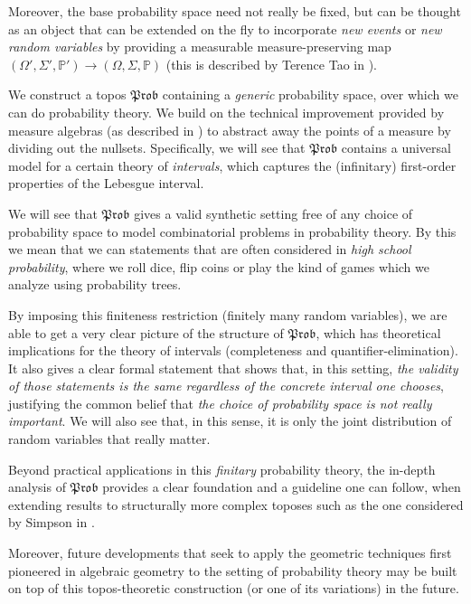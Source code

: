 \documentclass[a4paper]{amsproc}
\theoremstyle{plain}
\theoremstyle{definition}
\theoremstyle{remark}
\numberwithin{equation}{section}
\newcommand{\Prob}{\mathfrak{Prob}}
\begin{document}
Moreover, the base probability space need not really be fixed, but can be thought as an object that can be extended on the fly to incorporate \emph{new events} or \emph{new random variables} by providing a measurable measure-preserving map $(\Omega',\Sigma',\mathbb{P}') \to (\Omega,\Sigma, \mathbb{P})$ (this is described by Terence Tao in \cite{tao2010review}).

We construct a topos $\Prob$ containing a \emph{generic} probability space, over which we can do probability theory. We build on the technical improvement provided by measure algebras (as described in \cite{fremlin2012measure}) to abstract away the points of a measure by dividing out the nullsets. Specifically, we will see that $\Prob$ contains a universal model for a certain theory of \emph{intervals}, which captures the (infinitary) first-order properties of the Lebesgue interval.

We will see that $\Prob$ gives a valid synthetic setting free of any choice of probability space to model combinatorial problems in probability theory. By this we mean that we can statements that are often considered in \emph{high school probability}, where we roll dice, flip coins or play the kind of games which we analyze using probability trees.

By imposing this finiteness restriction (finitely many random variables), we are able to get a very clear picture of the structure of $\Prob$, which has theoretical implications for the theory of intervals (completeness and quantifier-elimination). It also gives a clear formal statement that shows that, in this setting, \emph{the validity of those statements is the same regardless of the concrete interval one chooses}, justifying the common belief that \emph{the choice of probability space is not really important}. We will also see that, in this sense, it is only the joint distribution of random variables that really matter.


Beyond practical applications in this \emph{finitary} probability theory, the in-depth analysis of $\Prob$ provides a clear foundation and a guideline one can follow, when extending results to structurally more complex toposes such as the one considered by Simpson in \cite{simpson2017probability}.

Moreover, future developments that seek to apply the geometric techniques first pioneered in algebraic geometry to the setting of probability theory may be built on top of this topos-theoretic construction (or one of its variations) in the future.
\end{document}
